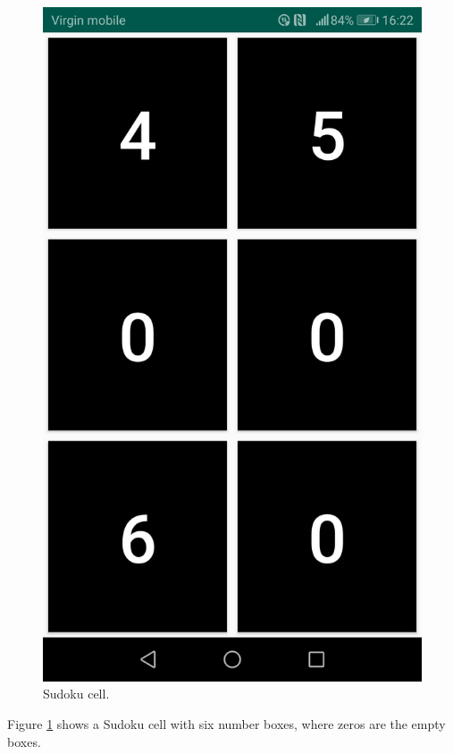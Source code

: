 \documentclass[a4paper,twoside,12pt]{book}
\begin{document}
\begin{figure}[H]
\centering
  \includegraphics[width=\linewidth/2]{sudoku cell.jpg}
  \caption{Sudoku cell.}
  \label{fig:Sudoku cell}
\end{figure}

Figure \ref{fig:Sudoku cell} shows a Sudoku cell with six number boxes, where zeros are the empty boxes. 
\fi
\end{document}
